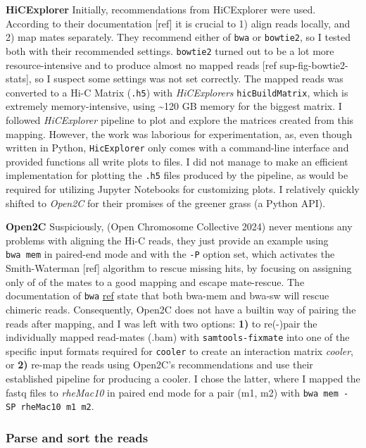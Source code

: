 \documentclass[
  11pt,
  a4paper,
]{scrbook}
\let\oldemph\emph
\renewcommand\emph[1]{\oldemph{\color{gray}#1}}
\begin{document}
\textbf{HiCExplorer} Initially, recommendations from HiCExplorer were
used. According to their documentation {[}ref{]} it is crucial to 1)
align reads locally, and 2) map mates separately. They recommend either
of \texttt{bwa} or \texttt{bowtie2}, so I tested both with their
recommended settings. \texttt{bowtie2} turned out to be a lot more
resource-intensive and to produce almost no mapped reads {[}ref
sup-fig-bowtie2-stats{]}, so I suspect some settings was not set
correctly. The mapped reads was converted to a Hi-C Matrix
(\texttt{.h5}) with \emph{HiCExplorers} \texttt{hicBuildMatrix}, which
is extremely memory-intensive, using \textasciitilde120 GB memory for
the biggest matrix. I followed \emph{HiCExplorer} pipeline to plot and
explore the matrices created from this mapping. However, the work was
laborious for experimentation, as, even though written in Python,
\texttt{HicExplorer} only comes with a command-line interface and
provided functions all write plots to files. I did not manage to make an
efficient implementation for plotting the \texttt{.h5} files produced by
the pipeline, as would be required for utilizing Jupyter Notebooks for
customizing plots. I relatively quickly shifted to \emph{Open2C} for
their promises of the greener grass (a Python API).

\textbf{Open2C} Suspiciously, (Open Chromosome Collective 2024) never
mentions any problems with aligning the Hi-C reads, they just provide an
example using \texttt{bwa\ mem} in paired-end mode and with the
\texttt{-P} option set, which activates the Smith-Waterman {[}ref{]}
algorithm to rescue missing hits, by focusing on assigning only of of
the mates to a good mapping and escape mate-rescue. The documentation of
\texttt{bwa} \href{https://bio-bwa.sourceforge.net}{ref} state that both
bwa-mem and bwa-sw will rescue chimeric reads. Consequently, Open2C does
not have a builtin way of pairing the reads after mapping, and I was
left with two options: \textbf{1)} to re(-)pair the individually mapped
read-mates (.bam) with \texttt{samtools-fixmate} into one of the
specific input formats required for \texttt{cooler} to create an
interaction matrix \emph{cooler}, or \textbf{2)} re-map the reads using
Open2C's recommendations and use their established pipeline for
producing a cooler. I chose the latter, where I mapped the fastq files
to \emph{rheMac10} in paired end mode for a pair (m1, m2) with
\texttt{bwa\ mem\ -SP\ rheMac10\ m1\ m2}.

\subsubsection{Parse and sort the reads}\label{parse-and-sort-the-reads}
\end{document}
